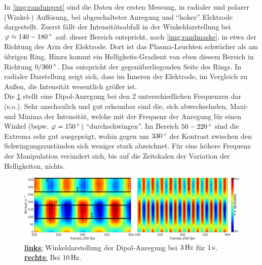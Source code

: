 \documentclass[numbers=noenddot,a4paper,notitlepage,twoside,BCOR15mm]{scrbook}
\newcommand{\degree}{^\circ}
\newcommand{\fett}[1]{\textbf{#1}}
\begin{document}
			In \ref{img:randungest} sind die Daten der ersten Messung, in radialer und polarer (Winkel-) Auflösung, bei abgeschalteter Anregung und "`hoher"' Elektrode dargestellt. Zuerst fällt der Intensitätsabfall in der Winkeldarstellung bei $\varphi\approx\unit[140-180]{\degree}$ auf: dieser Bereich entspricht, nach \ref{img:randmaske}, in etwa der Richtung des Arm der Elektrode. Dort ist das Plasma-Leuchten schwächer als am übrigen Ring. Hinzu kommt ein Helligkeits-Gradient von eben diesem Bereich in Richtung $\unit[0/360]{\degree}$. Das entspricht der gegenüberliegenden Seite des Rings. In radialer Darstellung zeigt sich, dass im Inneren der Elektrode, im Vergleich zu Außen, die Intensität wesentlich größer ist.\\
			Die \ref{img:randfrequenz} stellt eine Dipol-Anregung bei den 2 unterschiedlichen Frequenzen dar (s.o.).  Sehr anschaulich und gut erkennbar sind die, sich abwechselnden, Maxi- und Minima der Intensität, welche mit der Frequenz der Anregung für einen Winkel (bspw. $\varphi=\unit[150]{\degree}$) "`durchschwingen"'. Im Bereich $\unit[50-220]{\degree}$ sind die Extrema sehr gut ausgeprägt, wohin gegen um $\unit[330]{\degree}$ der Kontrast zwischen den Schwingungszuständen sich weniger stark abzeichnet. Für eine höhere Frequenz der Manipulation verändert sich, bis auf die Zeitskalen der Variation der Helligkeiten, nichts.

				\begin{figure}[!b]
			       	\centering
			       	\includegraphics[width=\textwidth,height=0.38\textwidth]{figs/auswertung/plasmaglw/randdipol3hzu10Hz1sekwink.png}
			       	\caption{\underline{\fett{links}:} Winkeldarstellung der Dipol-Anregung bei $\unit[3]{Hz}$ für $\unit[1]{s}$. \underline{\fett{rechts}:} Bei $\unit[10]{Hz}$.}
			       	\label{img:randfrequenz}
				\end{figure}
\end{document}
